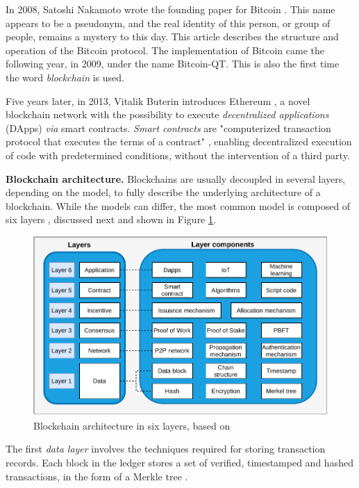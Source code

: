 In 2008, Satoshi Nakamoto wrote the founding paper for Bitcoin \cite{Nakamoto2008}. This name appears to be a pseudonym, and the real identity of this person, or group of people, remains a mystery to this day. This article describes the structure and operation of the Bitcoin protocol. The implementation of Bitcoin came the following year, in 2009, under the name
Bitcoin-QT. This is also the first time the word \emph{blockchain} is used.

Five years later, in 2013, Vitalik Buterin introduces Ethereum \cite{Buterin2014}, a novel blockchain network with the possibility to execute \emph{decentralized applications} (DApps) \emph{via} smart contracts. \emph{Smart contracts} are "computerized transaction protocol that executes the terms of a contract" \cite{Szabo1994}, enabling decentralized execution of code with predetermined conditions, without the intervention of a third party.

\textbf{Blockchain architecture.} Blockchains are usually decoupled in several layers, depending on the model, to fully describe the underlying architecture of a blockchain. While the models can differ, the most common model is composed of six layers \cite{Wen2021, Issa2023}, discussed next and shown in Figure \ref{F_layers}. 

\begin{figure}[t]
\centering
 \includegraphics[width=\textwidth]{Images/layers.pdf}
\caption{Blockchain architecture in six layers, based on \cite{Yuan2018}} 
\label{F_layers}
\end{figure}

The first \emph{data layer} involves the techniques required for storing transaction records. Each block in the ledger stores a set of verified, timestamped and hashed transactions, in the form of a Merkle tree \cite{Yuan2018, Issa2023}.

